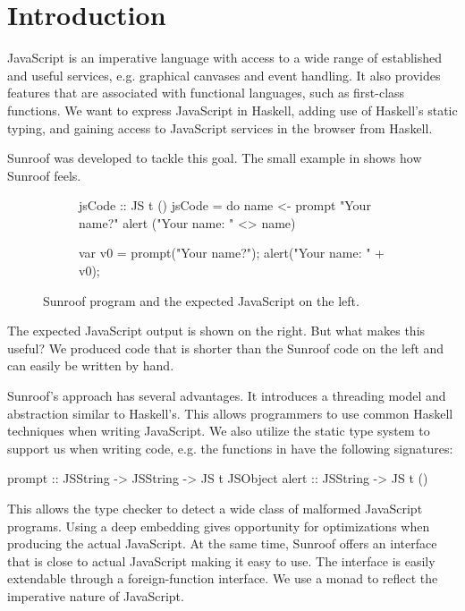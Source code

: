  
\section{Introduction}

JavaScript is an imperative language with access to a wide range
of established and useful services, e.g. graphical canvases and event
handling. It also provides features that are associated with 
functional languages, such as first-class functions. 
We want to express JavaScript in Haskell, adding use
of Haskell's static typing, and gaining access to JavaScript services
in the browser from Haskell.

Sunroof was developed to tackle this goal.
The small example in  
shows how Sunroof feels.
\begin{figure}
\centering
\begin{subfigure}{0.45\textwidth}%
\begin{Code}
 jsCode :: JS t ()
 jsCode = do
   name <- prompt "Your name?"
   alert ("Your name: " <> name)
\end{Code}%
\end{subfigure}%
\hfill%
\begin{subfigure}{0.45\textwidth}
\vspace{0.25cm}%
\begin{Code}
  
  
var v0 = prompt("Your name?"); 
alert("Your name: " + v0);
\end{Code}%
\end{subfigure}%
\caption{Sunroof program and the expected JavaScript on the left.}%
\label{fig:code-example}%
\vspace{0.5cm}%
\end{figure}
The expected JavaScript output is shown on the right. But what makes 
this useful? We produced code that is shorter 
than the Sunroof code on the left and can easily be written by hand.

Sunroof's approach has several advantages. 
It introduces a threading model and abstraction similar
to Haskell's. This allows programmers to use common Haskell 
techniques when writing JavaScript.
We also utilize the static type system to support us when 
writing code, e.g. the functions
in  have the following signatures:
\begin{Code}
prompt :: JSString -> JSString -> JS t JSObject
alert  :: JSString -> JS t ()
\end{Code}
This allows the type checker to detect a wide class
of malformed JavaScript programs.
Using a deep embedding gives opportunity 
for optimizations when producing the actual JavaScript.
At the same time, Sunroof offers an interface that is 
close to actual JavaScript making it easy to use.
The interface is easily extendable through
a foreign-function interface.
We use a monad \cite{Moggi:91:ComputationMonads} 
to reflect the imperative nature of JavaScript.

